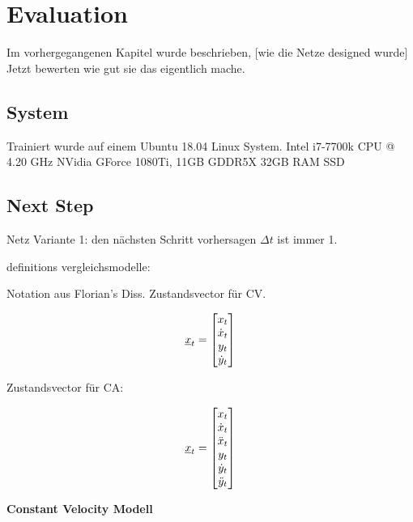 \chapter{Evaluation}

Im vorhergegangenen Kapitel wurde beschrieben, [wie die Netze designed wurde]
Jetzt bewerten wie gut sie das eigentlich mache.

\section{System}

Trainiert wurde auf einem Ubuntu 18.04 Linux System.
Intel i7-7700k CPU @ 4.20 GHz 
NVidia GForce 1080Ti, 11GB GDDR5X
32GB RAM
SSD 


\section{Next Step}

Netz Variante 1: den nächsten Schritt vorhersagen
\(\Delta t \) ist immer 1.

definitions vergleichsmodelle:

Notation aus Florian's Diss. Zustandsvector für CV.


\begin{equation*} \label{eq:definitionCV}
    {\underline{x}}_t = 
    \begin{bmatrix}
        x_t \\
        \dot{x}_t \\
        y_t \\
        \dot{y}_t
       \end{bmatrix} 
\end{equation*}


Zustandsvector für CA:

\begin{equation*} \label{eq:definitionCA}
    {\underline{x}}_t = 
    \begin{bmatrix}
        x_t \\
        \dot{x}_t \\
        \ddot{x}_t \\
        y_t \\
        \dot{y}_t \\
        \ddot{y}_t
       \end{bmatrix} 
\end{equation*}


\textbf{Constant Velocity Modell}

